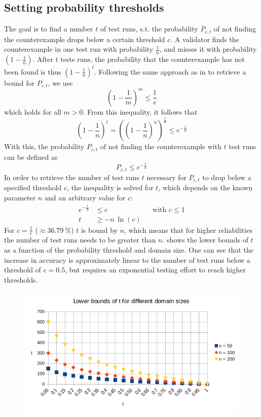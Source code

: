 \subsection{Setting probability thresholds}
The goal is to find a number $t$ of test runs, s.t. the probability $P_{c,t}$ of not finding the counterexample drops below a certain threshold $c$. A validator finds the counterexample in one test run with probability $\frac{1}{n}$, and misses it with probability $(1-\frac{1}{n})$. After $t$ tests runs, the probability that the counterexample has not been found is thus $(1-\frac{1}{n})^t$. Following the same approach as in \cite{mahl_schindel_2007} to retrieve a bound for $P_{c,t}$, we use
\begin{equation}
(1-\frac{1}{m})^m \leq \frac{1}{e}
\end{equation}
which holds for all $m > 0$. From this inequality, it follows that
\begin{equation}
(1-\frac{1}{n})^t = ((1-\frac{1}{n})^n)^{\frac{t}{n}} \le e^{-\frac{t}{n}}
\end{equation}
With this, the probability $P_{c,t}$ of not finding the counterexample with $t$ test runs can be defined as
\begin{equation}
P_{c,t} \le e^{-\frac{t}{n}}
\end{equation}
In order to retrieve the number of test runs $t$ necessary for $P_{c,t}$ to drop below a specified threshold $c$, the inequality is solved for $t$, which depends on the known parameter $n$ and an arbitrary value for $c$:
\begin{align}
    e^{-\frac{t}{n}} &\leq c && \text{with } c\le1 \nonumber\\
    t &\geq -n\:\ln(c)
\end{align}
For $c = \frac{1}{e}$ ($\approx 36.79\:\%$) $t$ is bound by $n$, which means that for higher reliabilities the number of test runs needs to be greater than $n$.  shows the lower bounds of $t$ as a function of the probability threshold and domain size. One can see that the increase in accuracy is approximately linear to the number of test runs below a threshold of $c=0.5$, but requires an exponential testing effort to reach higher thresholds.
\begin{figure}[h]
\includegraphics[width=0.95\linewidth]{figures/3-offline/graph_t_c}
\label{fig:graph_t_c}
\end{figure}
